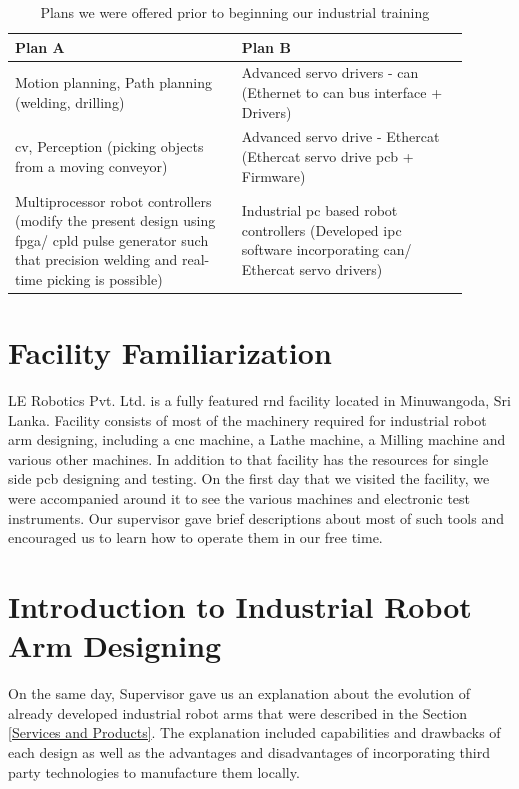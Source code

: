 \documentclass[a4paper,12pt]{report}
\begin{document}
\begin{table}[h]
	\captionsetup{font=sc, labelsep=newline}
	\centering
	\caption{Plans we were offered prior to beginning our industrial training}
	\begin{tabular}{|p{0.45\linewidth}  |p{0.45\linewidth}  |}
		\hline
		\textbf{Plan A} & \textbf{Plan B}\\\hline
		Motion planning, Path planning (welding, drilling) & 
		Advanced servo drivers - \Ac{can} (Ethernet to \ac{can} bus interface + Drivers)\\ \hline
		
		\ac{cv}, Perception (picking objects from a moving conveyor) &
		Advanced servo drive - Ethercat (Ethercat servo drive \ac{pcb} + Firmware)\\ \hline
		
		Multiprocessor robot controllers (modify the present design using \ac{fpga}/ \ac{cpld} pulse generator such that precision welding and real-time picking is possible)& 
		Industrial \ac{pc} based robot controllers (Developed \ac{ipc} software incorporating \ac{can}/ Ethercat servo drivers)\\
		\hline
	\end{tabular}
	\label{table:familiarize}
\end{table}

\section{Facility Familiarization}

LE Robotics Pvt. Ltd. is a fully featured \ac{rnd} facility located in Minuwangoda, Sri Lanka. Facility consists of most of the machinery required for industrial robot arm designing, including a \ac{cnc} machine, a Lathe machine, a Milling machine and various other machines. In addition to that facility has the resources for single side \ac{pcb} designing and testing. On the first day that we visited the facility, we were accompanied around it to see the various machines and electronic test instruments. Our supervisor gave brief descriptions about most of such tools and encouraged us to learn how to operate them in our free time.\\

\section{Introduction to Industrial Robot Arm Designing}

On the same day, Supervisor gave us an explanation about the evolution of already developed industrial robot arms that were described in the Section \ref{Services and Products}. The explanation included capabilities and drawbacks of each design as well as the advantages and disadvantages of incorporating third party technologies to manufacture them locally.\\
\end{document}
